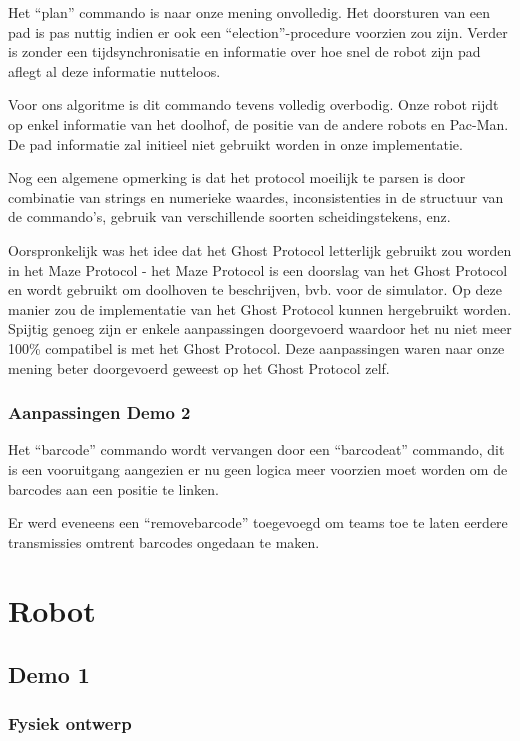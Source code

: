 \documentclass[12pt,a4paper]{report}
\begin{document}
Het ``plan'' commando is naar onze mening onvolledig. Het doorsturen van een pad is pas nuttig indien er ook een ``election''-procedure voorzien zou zijn. Verder is zonder een tijdsynchronisatie en informatie over hoe snel de robot zijn pad aflegt al deze informatie nutteloos.

Voor ons algoritme is dit commando tevens volledig overbodig. Onze robot rijdt op enkel informatie van het doolhof, de positie van de andere robots en Pac-Man. De pad informatie zal initieel niet gebruikt worden in onze implementatie.

Nog een algemene opmerking is dat het protocol moeilijk te parsen is door combinatie van strings en numerieke waardes, inconsistenties in de structuur van de commando's, gebruik van verschillende soorten scheidingstekens, enz.

Oorspronkelijk was het idee dat het Ghost Protocol letterlijk gebruikt zou worden in het Maze Protocol - het Maze Protocol is een doorslag van het Ghost Protocol en wordt gebruikt om doolhoven te beschrijven, bvb. voor de simulator. Op deze manier zou de implementatie van het Ghost Protocol kunnen hergebruikt worden. Spijtig genoeg zijn er enkele aanpassingen doorgevoerd waardoor het nu niet meer 100\% compatibel is met het Ghost Protocol. Deze aanpassingen waren naar onze mening beter doorgevoerd geweest op het Ghost Protocol zelf.

\subsection{Aanpassingen Demo 2}

Het ``barcode'' commando wordt vervangen door een ``barcodeat'' commando, dit is een vooruitgang aangezien er nu geen logica meer voorzien moet worden om de barcodes aan een positie te linken. 

Er werd eveneens een ``removebarcode'' toegevoegd om teams toe te laten eerdere transmissies omtrent barcodes ongedaan te maken.


\chapter{Robot}

\section{Demo 1}

\subsection{Fysiek ontwerp}
\end{document}
